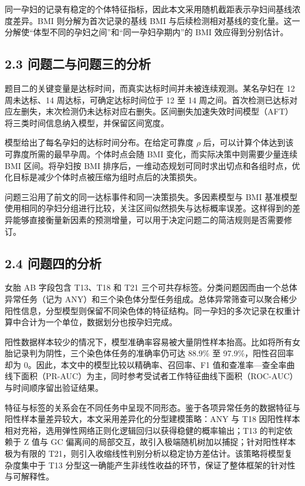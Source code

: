 \documentclass[UTF8,fontset=fandol,zihao=-4,a4paper]{ctexart}
\begin{document}
同一孕妇的记录有稳定的个体特征指标，因此本文采用随机截距表示孕妇间基线浓度差异。BMI
则分解为首次记录的基线 BMI
与后续检测相对基线的变化量。这一分解使``体型不同的孕妇之间''和``同一孕妇孕期内''的
BMI 效应得到分别估计。

\subsection{2.3
问题二与问题三的分析}\label{ux95eeux9898ux4e8cux4e0eux95eeux9898ux4e09ux7684ux5206ux6790}

题目二的关键变量是达标时间，而真实达标时间并未被连续观测。某名孕妇在 12
周未达标、14 周达标，可确定达标时间位于 12 至 14
周之间。首次检测已达标对应左删失，末次检测仍未达标对应右删失。区间删失加速失效时间模型（AFT）将三类时间信息纳入模型，并保留区间宽度。

模型给出了每名孕妇的达标时间分布。在给定可靠度 \(\rho\)
后，可以计算个体达到该可靠度所需的最早孕周。个体时点会随 BMI
变化，而实际决策中则需要少量连续 BMI 区间。将孕妇按 BMI
排序后，一维动态规划可同时求出切点和各组时点，优化目标是减少个体时点被压缩为组时点后的决策损失。

问题三沿用了前文的同一达标事件和同一决策损失。多因素模型与 BMI
基准模型使用相同的孕妇分组进行比较，关注区间似然损失与达标概率误差。这样得到的差异能够直接衡量新因素的预测增量，可以用于决定问题二的简洁规则是否需要修订。

\subsection{2.4
问题四的分析}\label{ux95eeux9898ux56dbux7684ux5206ux6790}

女胎 AB 字段包含 T13、T18 和 T21
三个可共存标签。分类问题因而由一个总体异常任务（记为
ANY）和三个染色体分型任务组成。总体异常筛查可以聚合稀少阳性信息，分型模型则保留不同染色体的特征结构。同一孕妇的多次记录在权重计算中合计为一个单位，数据划分也按孕妇完成。

阳性数据样本较少的情况下，模型准确率容易被大量阴性样本抬高。比如将所有女胎记录判为阴性，三个染色体任务的准确率仍可达
88.9\% 至 97.9\%，阳性召回率却为 0。因此，本文中的模型比较以精确率、召回率、F1
值和查准率---查全率曲线下面积（PR-AUC）为主，同时参考受试者工作特征曲线下面积（ROC-AUC）与时间顺序留出验证结果。

特征与标签的关系会在不同任务中呈现不同形态。鉴于各项异常任务的数据特征与阳性样本量差异较大，本文采用差异化的分型建模策略：ANY 与 T18 因阳性样本相对充裕，选用弹性网络正则化逻辑回归以获得稳健的概率输出；T13 的判定依赖于 Z 值与 GC 偏离间的局部交互，故引入极端随机树加以捕捉；针对阳性样本极为有限的 T21，则引入收缩线性判别分析以稳定协方差估计。该策略将模型复杂度集中于 T13 分型这一确能产生非线性收益的环节，保证了整体框架的针对性与可解释性。
\end{document}
